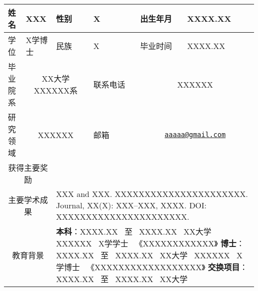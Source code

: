 
\large


\renewcommand{\arraystretch}{1.7}

\begin{table}[H]
\large
\begin{tabularx}{\textwidth}{|X|X|X|X|X|X|}
\hline
姓名 & XXX & 性别 & X & 出生年月 & XXXX.XX \\
\hline
学位 & X学博士 & 民族 & X & 毕业时间 & XXXX.XX \\
\hline
毕业院系 & \multicolumn{2}{c|}{XX大学XXXXXX系} & 联系电话 & \multicolumn{2}{c|}{XXXXXX} \\
\hline
研究领域 & \multicolumn{2}{c|}{XXXXXX} & 邮箱 & \multicolumn{2}{c|}{\href{mailto:aaaaa@gmail.com}{\nolinkurl{aaaaa@gmail.com}}} \\
\hline
\multicolumn{2}{|c|}{获得主要奖励} & \multicolumn{4}{p{\dimexpr0.667\textwidth-2\tabcolsep-2\arrayrulewidth}|}{} \\
\hline
\multicolumn{2}{|c|}{主要学术成果} & \multicolumn{4}{p{\dimexpr0.667\textwidth-2\tabcolsep-2\arrayrulewidth}|}{XXX and XXX. XXXXXXXXXXXXXXXXXXXXXX. Journal, XX(X): XXX–XXX, XXXX. DOI: XXXXXXXXXXXXXXXXXXXXXX.} \\
\hline
\multicolumn{2}{|c|}{教育背景} & \multicolumn{4}{p{\dimexpr0.667\textwidth-2\tabcolsep-2\arrayrulewidth}|}{{\bf 本科}：XXXX.XX~ 至~ XXXX.XX~ XX大学~ XXXXXX~ X学学士~ 《XXXXXXXXXXXX》\newline
{\bf 博士}：XXXX.XX~ 至~ XXXX.XX~ XX大学~ XXXXXX~ X学博士~ 《XXXXXXXXXXXXXXXXXX》\newline
{\bf 交换项目}：XXXX.XX~ 至~ XXXX.XX~ XX大学
} \\
\hline
\end{tabularx}
\end{table}
